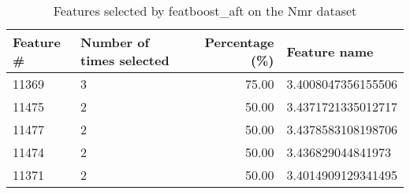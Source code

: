 \begin{table}
\caption{Features selected by featboost_aft on the Nmr dataset}
\label{tab:features_featboost_aft_nmr}
\begin{tabular}{llrl}
\toprule
Feature \# & Number of times selected & Percentage (\%) & Feature name \\
\midrule
11369 & 3 & 75.00 & 3.4008047356155506 \\
11475 & 2 & 50.00 & 3.4371721335012717 \\
11477 & 2 & 50.00 & 3.4378583108198706 \\
11474 & 2 & 50.00 & 3.436829044841973 \\
11371 & 2 & 50.00 & 3.4014909129341495 \\
\bottomrule
\end{tabular}
\end{table}
